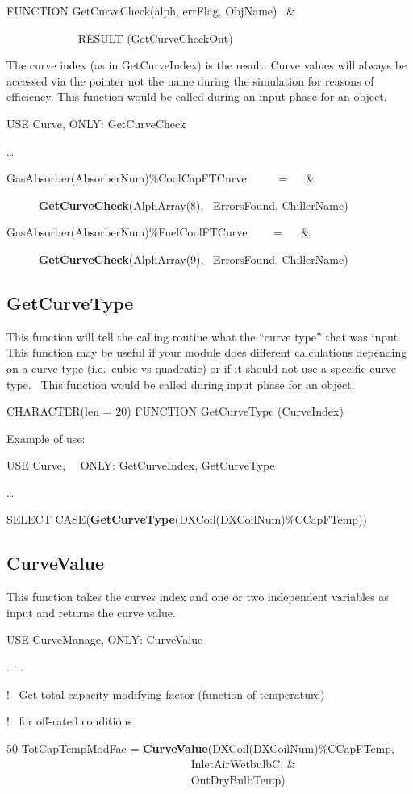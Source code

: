 FUNCTION GetCurveCheck(alph, errFlag, ObjName)~ \&

~~~~~~~~~~~~ RESULT (GetCurveCheckOut)

The curve index (as in GetCurveIndex) is the result. Curve values will always be accessed via the pointer not the name during the simulation for reasons of efficiency. This function would be called during an input phase for an object.

USE Curve, ONLY: GetCurveCheck

\ldots{}

GasAbsorber(AbsorberNum)\%CoolCapFTCurve~~~~~ = ~~ \&

~~~~~ \textbf{GetCurveCheck}(AlphArray(8),~ ErrorsFound, ChillerName)

GasAbsorber(AbsorberNum)\%FuelCoolFTCurve~~~~ = ~~ \&

~~~~~ \textbf{GetCurveCheck}(AlphArray(9),~ ErrorsFound, ChillerName)

\subsection{GetCurveType}\label{getcurvetype}

This function will tell the calling routine what the ``curve type'' that was input.~ This function may be useful if your module does different calculations depending on a curve type (i.e.~cubic vs quadratic) or if it should not use a specific curve type.~ This function would be called during input phase for an object.

CHARACTER(len = 20) FUNCTION GetCurveType (CurveIndex)

Example of use:

USE Curve,~~ ONLY: GetCurveIndex, GetCurveType

\ldots{}

SELECT CASE(\textbf{GetCurveType}(DXCoil(DXCoilNum)\%CCapFTemp))

\subsection{CurveValue}\label{curvevalue}

This function takes the curves index and one or two independent variables as input and returns the curve value.

USE CurveManage, ONLY: CurveValue

. . .

!~ Get total capacity modifying factor (function of temperature)

!~ for off-rated conditions

50 TotCapTempModFac = \textbf{CurveValue}(DXCoil(DXCoilNum)\%CCapFTemp, ~~~~~~~~~~~~~~~~~~~~~~~~~~~~~~~~ InletAirWetbulbC, \& ~~~~~~~~~~~~~~~~~~~~~~~~~~~~~~~~ OutDryBulbTemp)
